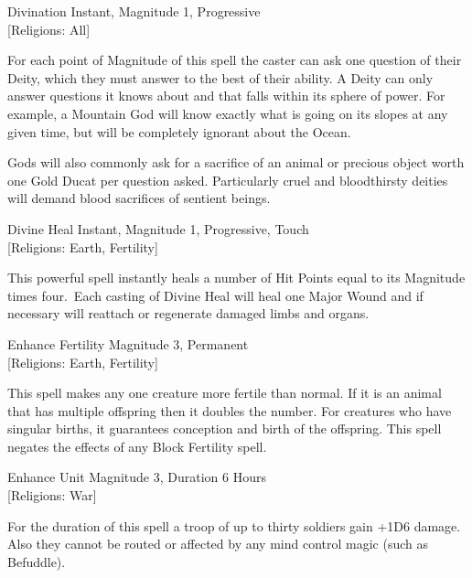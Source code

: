 \begin{samepage}
\begin{rpg-spell}
{Divination}
{Instant, Magnitude 1, Progressive\\{[Religions: All]}}

For each point of Magnitude of this spell the caster can ask one question of their Deity, which they must answer to the best of their ability. A Deity can only answer questions it knows about and that falls within its sphere of power. For example, a Mountain God will know exactly what is going on its slopes at any given time, but will be completely ignorant about the Ocean.

Gods will also commonly ask for a sacrifice of an animal or precious object worth one Gold Ducat per question asked. Particularly cruel and bloodthirsty deities will demand blood sacrifices of sentient beings.
\end{rpg-spell}
\end{samepage}

\begin{samepage}
\begin{rpg-spell}
{Divine Heal}
{Instant, Magnitude 1, Progressive, Touch\\{[Religions: Earth, Fertility]}}

This powerful spell instantly heals a number of Hit Points equal to its Magnitude times four. Each casting of Divine Heal will heal one Major Wound and if necessary will reattach or regenerate damaged limbs and organs.  
\end{rpg-spell}
\end{samepage}

\begin{samepage}
\begin{rpg-spell}
{Enhance Fertility}
{Magnitude 3, Permanent\\{[Religions: Earth, Fertility]}}

This spell makes any one creature more fertile than normal. If it is an animal that has multiple offspring then it doubles the number. For creatures who have singular births, it guarantees conception and birth of the offspring. This spell negates the effects of any Block Fertility spell. 
\end{rpg-spell}
\end{samepage}

\begin{samepage}
\begin{rpg-spell}
{Enhance Unit}
{Magnitude 3, Duration 6 Hours\\{[Religions: War]}}

For the duration of this spell a troop of up to thirty soldiers gain +1D6 damage. Also they cannot be routed or affected by any mind control magic (such as Befuddle).
\end{rpg-spell}
\end{samepage}

